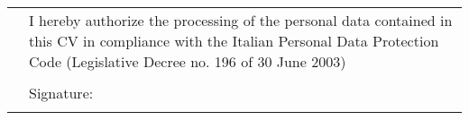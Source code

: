 \documentclass[helvetica, openbib, totpages, english]{europecv}
\begin{document}
\begin{europecv}
		

	\end{europecv}
	
	\null{}
	\flushright
	\begin{tabular}{rp{250pt}}
	 & \small I hereby authorize the processing of the personal data contained in this CV in compliance with the Italian Personal Data Protection Code (Legislative Decree no. 196 of 30 June 2003)\\
	 &\\
	 & Signature:\\
	 &\\
	  \bottomrule
	\end{tabular}
	
\end{document}
